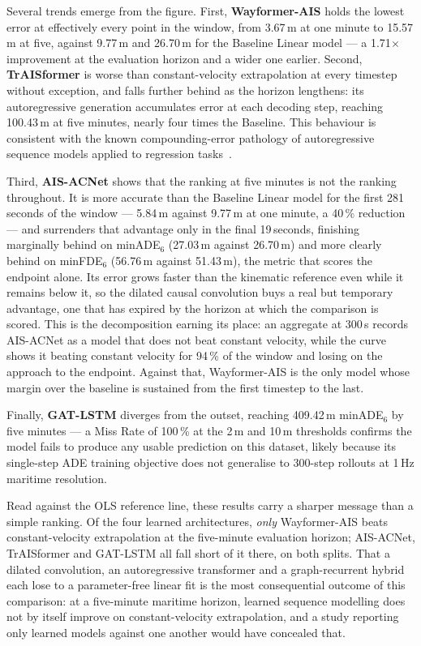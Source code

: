 \documentclass[12pt, a4paper]{article}
\begin{document}
  Several trends emerge from the figure.  First, \textbf{Wayformer-AIS} holds the
  lowest error at effectively every point in the window, from 3.67\,m at one
  minute to 15.57\,m at five, against 9.77\,m and 26.70\,m for the Baseline
  Linear model --- a 1.71$\times$ improvement at the evaluation horizon and a wider
  one earlier.  Second, \textbf{TrAISformer} is worse than constant-velocity
  extrapolation at every timestep without exception, and falls further behind as
  the horizon lengthens: its autoregressive generation accumulates error at each
  decoding step, reaching 100.43\,m at five minutes, nearly four times the
  Baseline.  This behaviour is consistent with the known compounding-error
  pathology of autoregressive sequence models applied to regression
  tasks~\citep{nguyen2021traisformer}.

  Third, \textbf{AIS-ACNet} shows that the ranking at five minutes is not the
  ranking throughout.  It is more accurate than the Baseline Linear model for the
  first 281\,seconds of the window --- 5.84\,m against 9.77\,m at one minute, a
  40\,\% reduction --- and surrenders that advantage only in the final
  19\,seconds, finishing marginally behind on minADE$_6$ (27.03\,m against
  26.70\,m) and more clearly behind on minFDE$_6$ (56.76\,m against 51.43\,m),
  the metric that scores the endpoint alone.  Its error grows faster than the
  kinematic reference even while it remains below it, so the dilated causal
  convolution buys a real but temporary advantage, one that has expired by the
  horizon at which the comparison is scored.  This is the decomposition earning
  its place: an aggregate at 300\,s records AIS-ACNet as a model that does not
  beat constant velocity, while the curve shows it beating constant velocity for
  94\,\% of the window and losing on the approach to the endpoint.  Against
  that, Wayformer-AIS is the only model whose margin over the baseline is
  sustained from the first timestep to the last.

  Finally, \textbf{GAT-LSTM} diverges from the outset, reaching 409.42\,m
  minADE$_6$ by five minutes --- a Miss Rate of 100\,\% at the 2\,m and 10\,m
  thresholds confirms the model fails to produce any usable prediction on this
  dataset, likely because its single-step ADE training objective does not
  generalise to 300-step rollouts at 1\,Hz maritime resolution.

  Read against the OLS reference line, these results carry a sharper message than
  a simple ranking.  Of the four learned architectures, \emph{only} Wayformer-AIS
  beats constant-velocity extrapolation at the five-minute evaluation horizon;
  AIS-ACNet, TrAISformer and GAT-LSTM all fall short of it there, on both splits.  That a dilated convolution, an autoregressive
  transformer and a graph-recurrent hybrid each lose to a parameter-free linear
  fit is the most consequential outcome of this comparison: at a five-minute
  maritime horizon, learned sequence modelling does not by itself improve on
  constant-velocity extrapolation, and a study reporting only learned models
  against one another would have concealed that.
\end{document}
